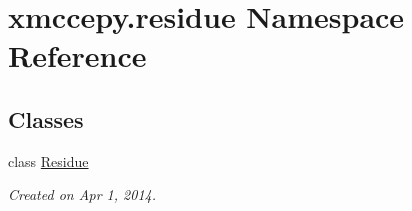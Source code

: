 \hypertarget{namespacexmccepy_1_1residue}{\section{xmccepy.\-residue Namespace Reference}
\label{namespacexmccepy_1_1residue}
}
\subsection*{Classes}
\begin{DoxyCompactItemize}
\item 
class \hyperlink{classxmccepy_1_1residue_1_1_residue}{Residue}
\begin{DoxyCompactList}\small\item\em Created on Apr 1, 2014. \end{DoxyCompactList}\end{DoxyCompactItemize}
